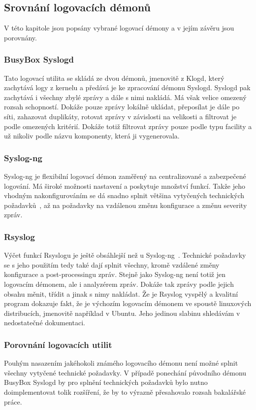 \documentclass[thesis=B,czech]{FITthesis}[2012/06/26]
\begin{document}
\subsection{Srovnání logovacích démonů}
V této kapitole jsou popsány vybrané logovací démony a v jejím závěru jsou porovnány.
\subsubsection{BusyBox Syslogd}
Tato logovací utilita se skládá ze dvou démonů, jmenovitě z Klogd, který zachytává logy z kernelu a předává je ke zpracování démonu Syslogd. Syslogd pak zachytává i všechny zbylé zprávy a dále s nimi nakládá. Má však velice omezený rozsah schopností. Dokáže pouze zprávy lokálně ukládat, přeposílat je dále po síti, zahazovat duplikáty, rotovat zprávy v závislosti na velikosti a filtrovat je podle omezených kritérií. Dokáže totiž filtrovat zprávy pouze podle typu facility a už nikoliv podle názvu komponenty, která ji vygenerovala.

\subsubsection{Syslog-ng}
Syslog-ng je flexibilní logovací démon zaměřený na centralizované a zabezpečené logování. Má široké možnosti nastavení a poskytuje množství funkcí. Takže jeho vhodným nakonfigurováním se dá snadno splnit většina vytyčených technických požadavků~\cite{syslogNg}, až na požadavky na vzdálenou změnu konfigurace a změnu severity zpráv.

\subsubsection{Rsyslog}
Výčet funkcí Rsyslogu je ještě obsáhlejší než u Syslog-ng~\cite{Rsyslog-features}. Technické požadavky se s jeho použitím tedy také dají splnit všechny, kromě vzdálené změny konfigurace a post-processingu zpráv. Stejně jako Syslog-ng není totiž jen logovacím démonem, ale i analyzérem zpráv. Dokáže tak zprávy podle jejich obsahu měnit, třídit a jinak s nimy nakládat.
Že je Rsyslog vyspělý a kvalitní program dokazuje fakt, že je výchozím logovacím démonem ve spoustě linuxových distribucích, jmenovitě například v Ubuntu.
Jeho jedinou slabinu shledávám v nedostatečné dokumentaci.

\subsubsection{Porovnání logovacích utilit}
Pouhým nasazením jakéhokoli známého logovacího démonu není možné splnit všechny vytyčené technické požadavky. V případě ponechání původního démonu BusyBox Syslogd by pro splnění technických požadavků bylo nutno doimplementovat tolik rozšíření, že by to výrazně přesahovalo rozsah bakalářské práce.
\end{document}
